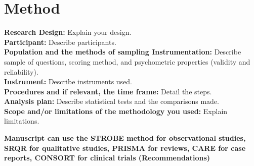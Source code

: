 \section{Method}
\textbf{Research Design:} Explain your design.\\
\textbf{Participant:} Describe participants.\\
\textbf{Population and the methods of sampling Instrumentation:} Describe sample of questions, scoring method, and psychometric properties (validity and reliability).\\
\textbf{Instrument:} Describe instruments used.\\
\textbf{Procedures and if relevant, the time frame:} Detail the steps.\\
\textbf{Analysis plan:} Describe statistical tests and the comparisons made.\\
\textbf{Scope and/or limitations of the methodology you used:} Explain limitations.

\begin{center}
\textbf{Manuscript can use the STROBE method for observational studies, SRQR for qualitative studies, PRISMA for reviews, CARE for case reports, CONSORT for clinical trials (Recommendations)}
\end{center}

